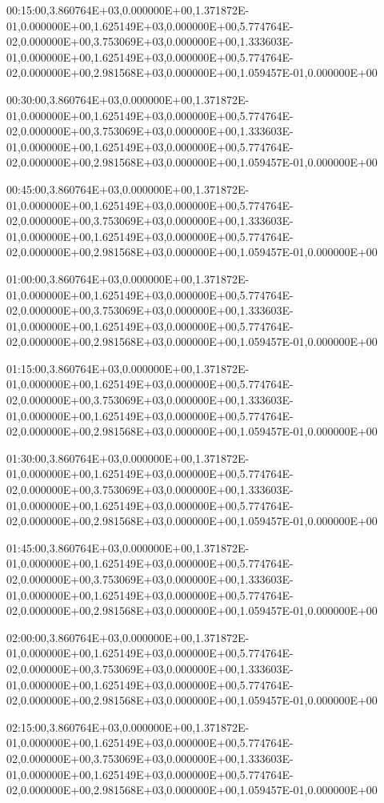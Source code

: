 00:15:00,3.860764E+03,0.000000E+00,1.371872E-01,0.000000E+00,1.625149E+03,0.000000E+00,5.774764E-02,0.000000E+00,3.753069E+03,0.000000E+00,1.333603E-01,0.000000E+00,1.625149E+03,0.000000E+00,5.774764E-02,0.000000E+00,2.981568E+03,0.000000E+00,1.059457E-01,0.000000E+00

00:30:00,3.860764E+03,0.000000E+00,1.371872E-01,0.000000E+00,1.625149E+03,0.000000E+00,5.774764E-02,0.000000E+00,3.753069E+03,0.000000E+00,1.333603E-01,0.000000E+00,1.625149E+03,0.000000E+00,5.774764E-02,0.000000E+00,2.981568E+03,0.000000E+00,1.059457E-01,0.000000E+00

00:45:00,3.860764E+03,0.000000E+00,1.371872E-01,0.000000E+00,1.625149E+03,0.000000E+00,5.774764E-02,0.000000E+00,3.753069E+03,0.000000E+00,1.333603E-01,0.000000E+00,1.625149E+03,0.000000E+00,5.774764E-02,0.000000E+00,2.981568E+03,0.000000E+00,1.059457E-01,0.000000E+00

01:00:00,3.860764E+03,0.000000E+00,1.371872E-01,0.000000E+00,1.625149E+03,0.000000E+00,5.774764E-02,0.000000E+00,3.753069E+03,0.000000E+00,1.333603E-01,0.000000E+00,1.625149E+03,0.000000E+00,5.774764E-02,0.000000E+00,2.981568E+03,0.000000E+00,1.059457E-01,0.000000E+00

01:15:00,3.860764E+03,0.000000E+00,1.371872E-01,0.000000E+00,1.625149E+03,0.000000E+00,5.774764E-02,0.000000E+00,3.753069E+03,0.000000E+00,1.333603E-01,0.000000E+00,1.625149E+03,0.000000E+00,5.774764E-02,0.000000E+00,2.981568E+03,0.000000E+00,1.059457E-01,0.000000E+00

01:30:00,3.860764E+03,0.000000E+00,1.371872E-01,0.000000E+00,1.625149E+03,0.000000E+00,5.774764E-02,0.000000E+00,3.753069E+03,0.000000E+00,1.333603E-01,0.000000E+00,1.625149E+03,0.000000E+00,5.774764E-02,0.000000E+00,2.981568E+03,0.000000E+00,1.059457E-01,0.000000E+00

01:45:00,3.860764E+03,0.000000E+00,1.371872E-01,0.000000E+00,1.625149E+03,0.000000E+00,5.774764E-02,0.000000E+00,3.753069E+03,0.000000E+00,1.333603E-01,0.000000E+00,1.625149E+03,0.000000E+00,5.774764E-02,0.000000E+00,2.981568E+03,0.000000E+00,1.059457E-01,0.000000E+00

02:00:00,3.860764E+03,0.000000E+00,1.371872E-01,0.000000E+00,1.625149E+03,0.000000E+00,5.774764E-02,0.000000E+00,3.753069E+03,0.000000E+00,1.333603E-01,0.000000E+00,1.625149E+03,0.000000E+00,5.774764E-02,0.000000E+00,2.981568E+03,0.000000E+00,1.059457E-01,0.000000E+00

02:15:00,3.860764E+03,0.000000E+00,1.371872E-01,0.000000E+00,1.625149E+03,0.000000E+00,5.774764E-02,0.000000E+00,3.753069E+03,0.000000E+00,1.333603E-01,0.000000E+00,1.625149E+03,0.000000E+00,5.774764E-02,0.000000E+00,2.981568E+03,0.000000E+00,1.059457E-01,0.000000E+00

